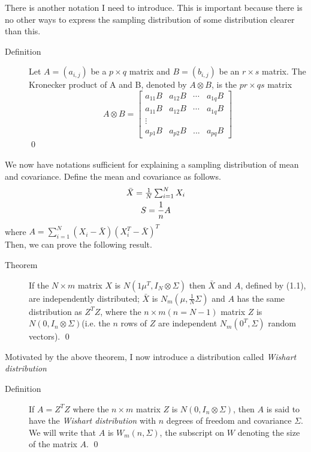 \documentclass[openany]{memoir}
\begin{document}
There is another notation I need to introduce. This is important because there is no other ways to express the sampling distribution of some distribution clearer than this.

\begin{description} 
	\item[Definition] Let $A=(a_{i,j})$ be a $p \times q$ matrix and $B=(b_{i,j})$ be an $r \times s$ matrix. The Kronecker product of A and B, denoted by $A \otimes B$, is the $pr \times qs$ matrix 
	$$A \otimes B = \begin{bmatrix}
	a_{11}B & a_{12}B & \cdots & a_{1q}B \\
	a_{11}B & a_{12}B & \cdots & a_{1q}B \\
	\vdots \\
    a_{p1}B & a_{p2}B & ... & a_{pq}B
    \end{bmatrix}$$ \qed
\end{description}

We now have notations sufficient for explaining a sampling distribution of mean and covariance. Define the mean and covariance as follows.
\begin{equation}
\begin{gathered}
$$\bar{X} = \frac{1}{N} \sum_{i=1}^{N} X_i \\
S = \frac{1}{n}A$$
\end{gathered}
\end{equation}
where $A = \sum_{i=1}^{N} (X_i - \bar{X})(X^{T}_{i} - \bar{X})^{T}$\\

Then, we can prove the following result.

\begin{description}
\item[Theorem] If the $N \times m$ matrix $X$ is $N(1\mu^{T}, I_N \otimes \Sigma)$ then $\bar{X}$ and $A$, defined by (1.1), are independently distributed; $\bar{X}$ is $N_m(\mu, \frac{1}{N} \Sigma)$ and $A$ has the same distribution as $Z^TZ$, where the $n \times m(n = N - 1)$ matrix $Z$ is $N(0, I_n \otimes \Sigma)$(i.e. the $n$ rows of $Z$ are independent $N_m(0^T, \Sigma)$ random vectors). \qed
\end{description}

Motivated by the above theorem, I now introduce a distribution called \textit{Wishart distribution}

\begin{description}
\item[Definition] If $A = Z^TZ$ where the $n \times m$ matrix $Z$ is $N(0, I_n \otimes \Sigma)$, then $A$ is said to have the \textit{Wishart distribution} with $n$ degrees of freedom and covariance $\Sigma$. We will write that $A$ is $W_m(n, \Sigma)$, the subscript on $W$ denoting the size of the matrix $A$. \qed
\end{description}
\end{document}
